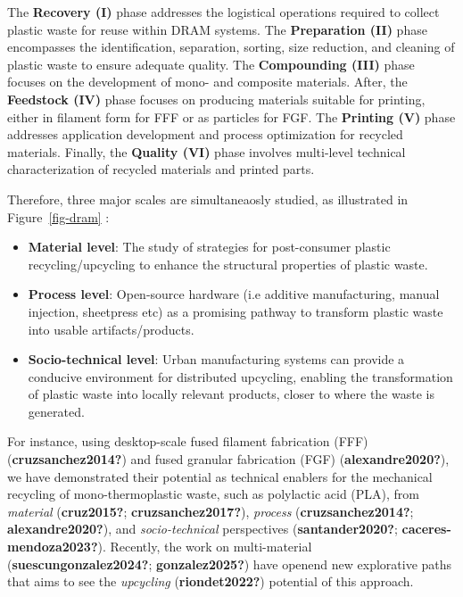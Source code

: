 \documentclass[
  12pt,
  openany]{book}
\providecommand{\tightlist}{%
  \setlength{\itemsep}{0pt}\setlength{\parskip}{0pt}}
\begin{document}
The \textbf{Recovery (I)} phase addresses the logistical operations
required to collect plastic waste for reuse within DRAM systems. The
\textbf{Preparation (II)} phase encompasses the identification,
separation, sorting, size reduction, and cleaning of plastic waste to
ensure adequate quality. The \textbf{Compounding (III)} phase focuses on
the development of mono- and composite materials. After, the
\textbf{Feedstock (IV)} phase focuses on producing materials suitable
for printing, either in filament form for FFF or as particles for FGF.
The \textbf{Printing (V)} phase addresses application development and
process optimization for recycled materials. Finally, the
\textbf{Quality (VI)} phase involves multi-level technical
characterization of recycled materials and printed parts.

Therefore, three major scales are simultaneaosly studied, as illustrated
in Figure~\ref{fig-dram} :

\begin{itemize}
\tightlist
\item
  \textbf{Material level}: The study of strategies for post-consumer
  plastic recycling/upcycling to enhance the structural properties of
  plastic waste.
\item
  \textbf{Process level}: Open-source hardware (i.e additive
  manufacturing, manual injection, sheetpress etc) as a promising
  pathway to transform plastic waste into usable artifacts/products.
\item
  \textbf{Socio-technical level}: Urban manufacturing systems can
  provide a conducive environment for distributed upcycling, enabling
  the transformation of plastic waste into locally relevant products,
  closer to where the waste is generated.
\end{itemize}

For instance, using desktop-scale fused filament fabrication (FFF)
(\textbf{cruzsanchez2014?}) and fused granular fabrication (FGF)
(\textbf{alexandre2020?}), we have demonstrated their potential as
technical enablers for the mechanical recycling of mono-thermoplastic
waste, such as polylactic acid (PLA), from \emph{material}
(\textbf{cruz2015?}; \textbf{cruzsanchez2017?}), \emph{process}
(\textbf{cruzsanchez2014?}; \textbf{alexandre2020?}), and
\emph{socio-technical} perspectives (\textbf{santander2020?};
\textbf{caceres-mendoza2023?}). Recently, the work on multi-material
(\textbf{suescungonzalez2024?}; \textbf{gonzalez2025?}) have openend new
explorative paths that aims to see the \emph{upcycling}
(\textbf{riondet2022?}) potential of this approach.
\end{document}
